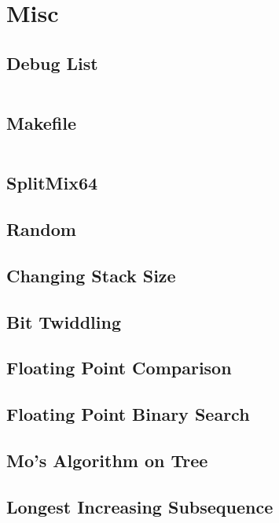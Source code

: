 \documentclass[10pt, a4paper, twocolumn, oneside]{article}
\begin{document}
\fontsize{7.2pt}{9pt}\selectfont

\tableofcontents
\newpage

\section{Misc}
    \subsection{Debug List}
        \inputminted{md}{content/misc/debug-list.txt}
    \subsection{Makefile}
        \inputminted{makefile}{content/misc/makefile}
    \subsection{SplitMix64}
    \subsection{Random}
    \subsection{Changing Stack Size}
    \subsection{Bit Twiddling}
    \subsection{Floating Point Comparison}
    \subsection{Floating Point Binary Search}
    \subsection{Mo's Algorithm on Tree}
    \subsection{Longest Increasing Subsequence}
\end{document}
